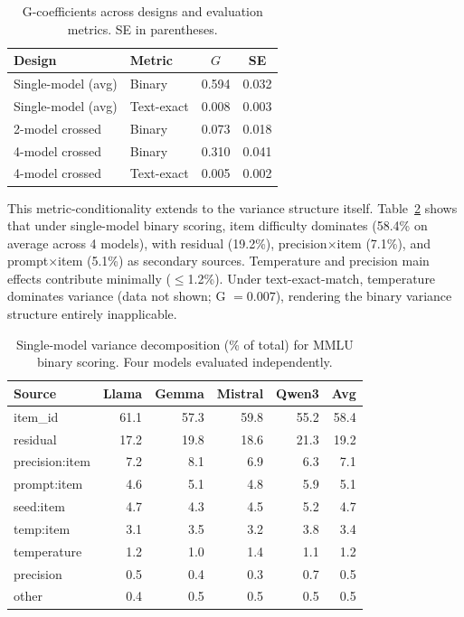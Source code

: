 \documentclass[letterpaper]{article}
\begin{document}
\begin{table}[t]
\centering
\caption{G-coefficients across designs and evaluation metrics. SE in parentheses.}
\label{tab:gcoeff}
\small
\begin{tabular}{llcc}
\toprule
Design & Metric & $G$ & SE \\
\midrule
Single-model (avg) & Binary & 0.594 & 0.032 \\
Single-model (avg) & Text-exact & 0.008 & 0.003 \\
2-model crossed & Binary & 0.073 & 0.018 \\
4-model crossed & Binary & 0.310 & 0.041 \\
4-model crossed & Text-exact & 0.005 & 0.002 \\
\bottomrule
\end{tabular}
\end{table}

This metric-conditionality extends to the variance structure itself. Table~\ref{tab:singlemodel} shows that under single-model binary scoring, item difficulty dominates (58.4\% on average across 4 models), with residual (19.2\%), precision$\times$item (7.1\%), and prompt$\times$item (5.1\%) as secondary sources. Temperature and precision main effects contribute minimally ($\leq$1.2\%). Under text-exact-match, temperature dominates variance (data not shown; G $= 0.007$), rendering the binary variance structure entirely inapplicable.

\begin{table}[t]
\centering
\caption{Single-model variance decomposition (\% of total) for MMLU binary scoring. Four models evaluated independently.}
\label{tab:singlemodel}
\small
\begin{tabular}{lrrrrr}
\toprule
Source & Llama & Gemma & Mistral & Qwen3 & Avg \\
\midrule
item\_id & 61.1 & 57.3 & 59.8 & 55.2 & 58.4 \\
residual & 17.2 & 19.8 & 18.6 & 21.3 & 19.2 \\
precision:item & 7.2 & 8.1 & 6.9 & 6.3 & 7.1 \\
prompt:item & 4.6 & 5.1 & 4.8 & 5.9 & 5.1 \\
seed:item & 4.7 & 4.3 & 4.5 & 5.2 & 4.7 \\
temp:item & 3.1 & 3.5 & 3.2 & 3.8 & 3.4 \\
temperature & 1.2 & 1.0 & 1.4 & 1.1 & 1.2 \\
precision & 0.5 & 0.4 & 0.3 & 0.7 & 0.5 \\
other & 0.4 & 0.5 & 0.5 & 0.5 & 0.5 \\
\bottomrule
\end{tabular}
\end{table}
\end{document}
